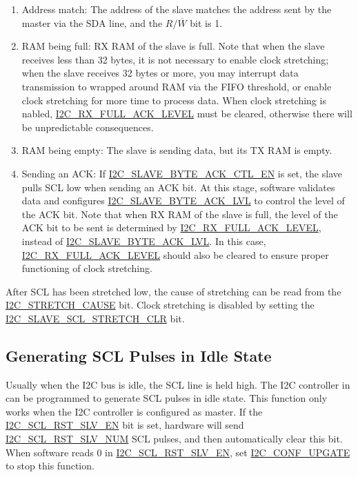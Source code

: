 \documentclass[main\_\_EN.tex]{subfiles}
\begin{document}
\begin{enumerate}
\item Address match: The address of the slave matches the address sent by the master via the SDA line, and the $R/\overline W$ bit is 1.
\item RAM being full: RX RAM of the slave is full. Note that when the slave receives less than 32 bytes, it is not necessary to enable clock stretching; when the slave receives 32 bytes or more, you may interrupt data transmission to wrapped around RAM via the FIFO threshold, or enable clock stretching for more time to process data. When clock stretching is nabled, \hyperref[fielddesc:I2CRXFULLACKLEVEL]{I2C\_RX\_FULL\_ACK\_LEVEL} must be cleared, otherwise there will be unpredictable consequences.
\item RAM being empty: The slave is sending data, but its TX RAM is empty.
\item Sending an ACK: If \hyperref[fielddesc:I2CSLAVEBYTEACKCTLEN]{I2C\_SLAVE\_BYTE\_ACK\_CTL\_EN} is set, the slave pulls SCL low when sending an ACK bit. At this stage, software validates data and configures \hyperref[fielddesc:I2CSLAVEBYTEACKLVL]{I2C\_SLAVE\_BYTE\_ACK\_LVL} to control the level of the ACK bit. Note that when RX RAM of the slave is full, the level of the ACK bit to be sent is determined by \hyperref[fielddesc:I2CRXFULLACKLEVEL]{I2C\_RX\_FULL\_ACK\_LEVEL}, instead of \hyperref[fielddesc:I2CSLAVEBYTEACKLVL]{I2C\_SLAVE\_BYTE\_ACK\_LVL}. In this case, \hyperref[fielddesc:I2CRXFULLACKLEVEL]{I2C\_RX\_FULL\_ACK\_LEVEL} should also be cleared to ensure proper functioning of clock stretching.
\end{enumerate}

After SCL has been stretched low, the cause of stretching can be read from the \hyperref[fielddesc:I2CSTRETCHCAUSE]{I2C\_STRETCH\_CAUSE} bit. Clock stretching is disabled by setting the \hyperref[fielddesc:I2CSLAVESCLSTRETCHCLR]{I2C\_SLAVE\_SCL\_STRETCH\_CLR} bit.

\subsection{Generating SCL Pulses in Idle State}
Usually when the I2C bus is idle, the SCL line is held high. The I2C controller in \chipname{} can be programmed to generate SCL pulses in idle state. This function only works when the I2C controller is configured as master. If the \hyperref[fielddesc:I2CSCLRSTSLVEN]{I2C\_SCL\_RST\_SLV\_EN} bit is set, hardware will send \hyperref[fielddesc:I2CSCLRSTSLVNUM]{I2C\_SCL\_RST\_SLV\_NUM} SCL pulses, and then automatically clear this bit. When software reads 0 in  \hyperref[fielddesc:I2CSCLRSTSLVEN]{I2C\_SCL\_RST\_SLV\_EN}, set \hyperref[fielddesc:I2CCONFUPGATE]{I2C\_CONF\_UPGATE} to stop this function.
\end{document}
